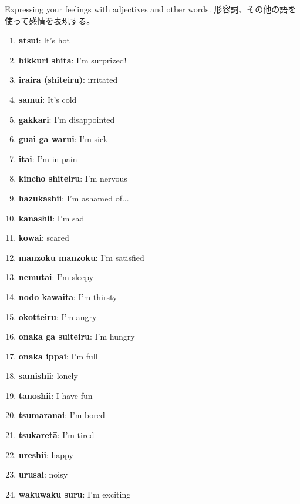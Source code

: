 \documentclass[uplatex,dvipdfmx,b5paper,english,10pt]{jsbook}
\begin{document}
\begin{toiquestion}
\ifEnglish
Expressing your feelings with adjectives and other words.
\else
形容詞、その他の語を使って感情を表現する。
\fi
\end{toiquestion}

\begin{multicols}{2}
 \begin{enumerate}
  \item {\bfseries atsui}: It's hot %
  \item {\bfseries bikkuri shita}: I'm surprized! %
  \item {\bfseries iraira (shiteiru)}: irritated %
  \item {\bfseries samui}: It's cold %
  \item {\bfseries gakkari}: I'm disappointed %
  \item {\bfseries guai ga warui}: I'm sick %
  \item {\bfseries itai}: I'm in pain %
  \item {\bfseries kinch\=o shiteiru}: I'm nervous %
  \item {\bfseries hazukashii}: I'm ashamed of... %
  \item {\bfseries kanashii}: I'm sad %
  \item {\bfseries kowai}: scared %
  \item {\bfseries manzoku manzoku}: I'm satisfied %
  \item {\bfseries nemutai}: I'm sleepy %
  \item {\bfseries nodo kawaita}: I'm thirsty %
  \item {\bfseries okotteiru}: I'm angry %
  \item {\bfseries onaka ga suiteiru}: I'm hungry %
  \item {\bfseries onaka ippai}: I'm full %
  \item {\bfseries samishii}: lonely %
  \item {\bfseries tanoshii}: I have fun %
  \item {\bfseries tsumaranai}: I'm bored %
  \item {\bfseries tsukaret\=a}: I'm tired %
  \item {\bfseries ureshii}: happy %
  \item {\bfseries urusai}: noisy %
  \item {\bfseries wakuwaku suru}: I'm exciting %
 \end{enumerate}
\end{multicols}
\end{document}
